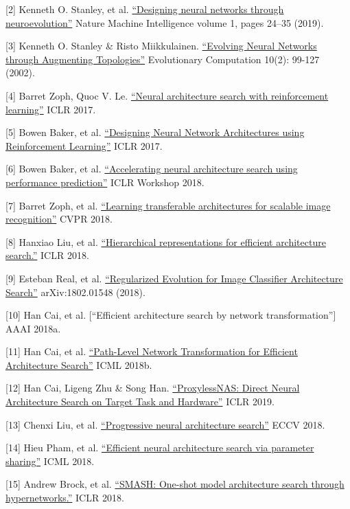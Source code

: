 {[}2{]} Kenneth O. Stanley, et al. \href{https://www.nature.com/articles/s42256-018-0006-z}{``Designing neural networks through neuroevolution''} Nature Machine Intelligence volume 1, pages 24--35 (2019).

{[}3{]} Kenneth O. Stanley \& Risto Miikkulainen. \href{http://nn.cs.utexas.edu/downloads/papers/stanley.ec02.pdf}{``Evolving Neural Networks through Augmenting Topologies''} Evolutionary Computation 10(2): 99-127 (2002).

{[}4{]} Barret Zoph, Quoc V. Le. \href{https://arxiv.org/abs/1611.01578}{``Neural architecture search with reinforcement learning''} ICLR 2017.

{[}5{]} Bowen Baker, et al. \href{https://arxiv.org/abs/1611.02167}{``Designing Neural Network Architectures using Reinforcement Learning''} ICLR 2017.

{[}6{]} Bowen Baker, et al. \href{https://arxiv.org/abs/1705.10823}{``Accelerating neural architecture search using performance prediction''} ICLR Workshop 2018.

{[}7{]} Barret Zoph, et al. \href{https://arxiv.org/abs/1707.07012}{``Learning transferable architectures for scalable image recognition''} CVPR 2018.

{[}8{]} Hanxiao Liu, et al. \href{https://arxiv.org/abs/1711.00436}{``Hierarchical representations for efficient architecture search.''} ICLR 2018.

{[}9{]} Esteban Real, et al. \href{https://arxiv.org/abs/1802.01548}{``Regularized Evolution for Image Classifier Architecture Search''} arXiv:1802.01548 (2018).

{[}10{]} Han Cai, et al. {[}``Efficient architecture search by network transformation''{]} AAAI 2018a.

{[}11{]} Han Cai, et al. \href{https://arxiv.org/abs/1806.02639}{``Path-Level Network Transformation for Efficient Architecture Search''} ICML 2018b.

{[}12{]} Han Cai, Ligeng Zhu \& Song Han. \href{https://arxiv.org/abs/1812.00332}{``ProxylessNAS: Direct Neural Architecture Search on Target Task and Hardware''} ICLR 2019.

{[}13{]} Chenxi Liu, et al. \href{https://arxiv.org/abs/1712.00559}{``Progressive neural architecture search''} ECCV 2018.

{[}14{]} Hieu Pham, et al. \href{https://arxiv.org/abs/1802.03268}{``Efficient neural architecture search via parameter sharing''} ICML 2018.

{[}15{]} Andrew Brock, et al. \href{https://arxiv.org/abs/1708.05344}{``SMASH: One-shot model architecture search through hypernetworks.''} ICLR 2018.

